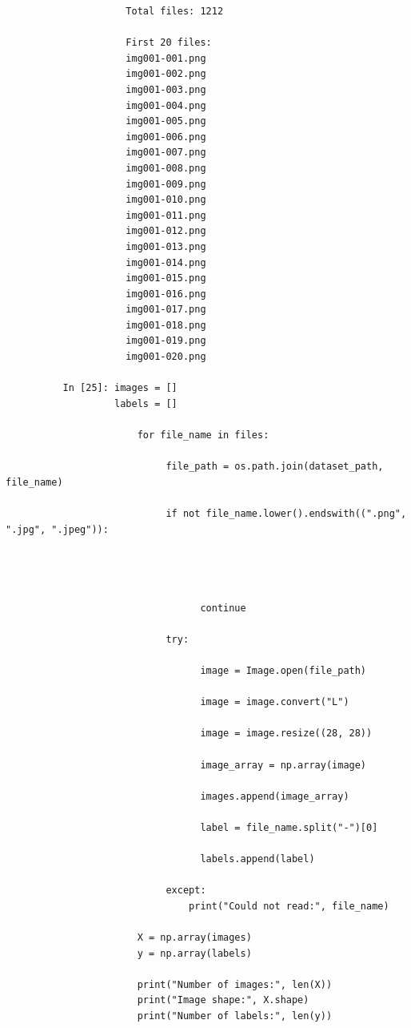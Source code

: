 \documentclass[12pt,a4paper]{article}
\begin{document}
\begin{lstlisting}
                     Total files: 1212

                     First 20 files:
                     img001-001.png
                     img001-002.png
                     img001-003.png
                     img001-004.png
                     img001-005.png
                     img001-006.png
                     img001-007.png
                     img001-008.png
                     img001-009.png
                     img001-010.png
                     img001-011.png
                     img001-012.png
                     img001-013.png
                     img001-014.png
                     img001-015.png
                     img001-016.png
                     img001-017.png
                     img001-018.png
                     img001-019.png
                     img001-020.png

          In [25]: images = []
                   labels = []

                       for file_name in files:

                            file_path = os.path.join(dataset_path, file_name)

                            if not file_name.lower().endswith((".png", ".jpg", ".jpeg")):




                                  continue

                            try:

                                  image = Image.open(file_path)

                                  image = image.convert("L")

                                  image = image.resize((28, 28))

                                  image_array = np.array(image)

                                  images.append(image_array)

                                  label = file_name.split("-")[0]

                                  labels.append(label)

                            except:
                                print("Could not read:", file_name)

                       X = np.array(images)
                       y = np.array(labels)

                       print("Number of images:", len(X))
                       print("Image shape:", X.shape)
                       print("Number of labels:", len(y))


\end{lstlisting}
\end{document}
